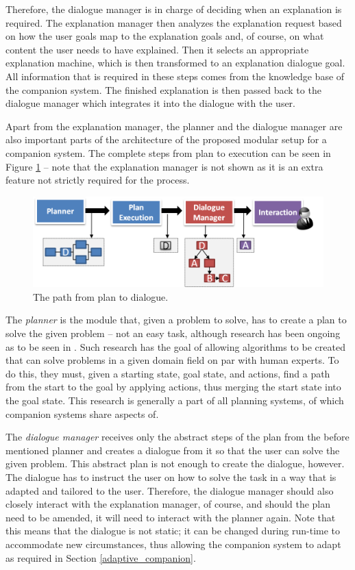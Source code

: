 \documentclass[a4paper]{article}
\begin{document}
Therefore, the dialogue manager is in charge of deciding when an explanation is required. The explanation manager then analyzes the explanation request based on how the user goals map to the explanation goals and, of course, on what content the user needs to have explained. Then it selects an appropriate explanation machine, which is then transformed to an explanation dialogue goal. All information that is required in these steps comes from the knowledge base of the companion system. The finished explanation is then passed back to the dialogue manager which integrates it into the dialogue with the user.

Apart from the explanation manager, the planner and the dialogue manager are also important parts of the architecture of the proposed modular setup for a companion system. The complete steps from plan to execution can be seen in Figure \ref{fig:planner} – note that the explanation manager is not shown as it is an extra feature not strictly required for the process.

\begin{figure}[H]
	\centering
	\includegraphics[width=12cm]{planner.png}
	\caption{The path from plan to dialogue.}
	\label{fig:planner}
\end{figure}

The {\it planner} is the module that, given a problem to solve, has to create a plan to solve the given problem – not an easy task, although research has been ongoing as to be seen in \cite{seegebarth2011formale}. Such research has the goal of allowing algorithms to be created that can solve problems in a given domain field on par with human experts. To do this, they must, given a starting state, goal state, and actions, find a path from the start to the goal by applying actions, thus merging the start state into the goal state. This research is generally a part of all planning systems, of which companion systems share aspects of.

The {\it dialogue manager} receives only the abstract steps of the plan from the before mentioned planner and creates a dialogue from it so that the user can solve the given problem. This abstract plan is not enough to create the dialogue, however. The dialogue has to instruct the user on how to solve the task in a way that is adapted and tailored to the user. Therefore, the dialogue manager should also closely interact with the explanation manager, of course, and should the plan need to be amended, it will need to interact with the planner again. Note that this means that the dialogue is not static; it can be changed during run-time to accommodate new circumstances, thus allowing the companion system to adapt as required in Section \ref{adaptive_companion}.
\end{document}
